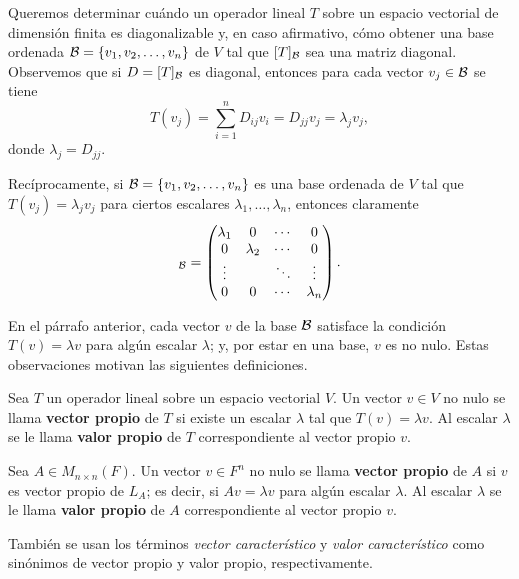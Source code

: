 \documentclass[12pt,a4paper]{book}
\begin{document}
    Queremos determinar cuándo un operador lineal $T$ sobre un espacio vectorial de dimensión finita es diagonalizable y, en caso afirmativo, cómo obtener una base ordenada $\mathcal{B} = \{v_1, v_2, \dots, v_n\}$ de $V$ tal que $[T]_{\mathcal{B}}$ sea una matriz diagonal. Observemos que si $D = [T]_{\mathcal{B}}$ es diagonal, entonces para cada vector $v_j \in \mathcal{B}$ se tiene
    \begin{equation*}
        T(v_j) = \sum_{i=1}^{n} D_{ij} v_i = D_{jj} v_j = \lambda_j v_j,
    \end{equation*}
    donde $\lambda_j = D_{jj}$.

    Recíprocamente, si $\mathcal{B} = \{v_1, v_2, \dots, v_n\}$ es una base ordenada de $V$ tal que $T(v_j) = \lambda_j v_j$ para ciertos escalares $\lambda_1, \dots, \lambda_n$, entonces claramente
    \begin{equation*}
        [T]_{\BB} =
        \begin{pmatrix}
            \lambda_1 & 0 & \cdots & 0 \\
            0 & \lambda_2 & \cdots & 0 \\
            \vdots & & \ddots & \vdots \\
            0 & 0 & \cdots & \lambda_n
        \end{pmatrix}.
    \end{equation*}

    En el párrafo anterior, cada vector $v$ de la base $\mathcal{B}$ satisface la condición $T(v) = \lambda v$ para algún escalar $\lambda$; y, por estar en una base, $v$ es no nulo. Estas observaciones motivan las siguientes definiciones.

    \begin{definicion}
        Sea $T$ un operador lineal sobre un espacio vectorial $V$. Un vector $v \in V$ no nulo se llama \textbf{vector propio} de $T$ si existe un escalar $\lambda$ tal que $T(v) = \lambda v$. Al escalar $\lambda$ se le llama \textbf{valor propio} de $T$ correspondiente al vector propio $v$.

        Sea $A \in M_{n \times n}(F)$. Un vector $v \in F^n$ no nulo se llama \textbf{vector propio} de $A$ si $v$ es vector propio de $L_A$; es decir, si $Av = \lambda v$ para algún escalar $\lambda$. Al escalar $\lambda$ se le llama \textbf{valor propio} de $A$ correspondiente al vector propio $v$.
    \end{definicion}

    También se usan los términos \textit{vector característico} y \textit{valor característico} como sinónimos de vector propio y valor propio, respectivamente.
\end{document}

